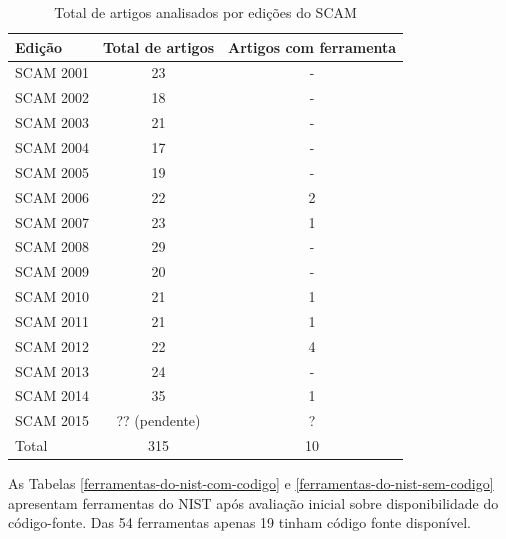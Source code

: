 \documentclass[qual, classic, a4paper]{ufbathesis}
\begin{document}
\begin{table}
\caption{Total de artigos analisados por edições do SCAM}
\centering
\begin{tabular}{| l | c | c |}
\hline
Edição    & Total de artigos & Artigos com ferramenta \\
\hline
SCAM 2001 & 23               & -                      \\
SCAM 2002 & 18               & -                      \\
SCAM 2003 & 21               & -                      \\
SCAM 2004 & 17               & -                      \\
SCAM 2005 & 19               & -                      \\
SCAM 2006 & 22               & 2                      \\
SCAM 2007 & 23               & 1                      \\
SCAM 2008 & 29               & -                      \\
SCAM 2009 & 20               & -                      \\
SCAM 2010 & 21               & 1                      \\
SCAM 2011 & 21               & 1                      \\
SCAM 2012 & 22               & 4                      \\
SCAM 2013 & 24               & -                      \\
SCAM 2014 & 35               & 1                      \\
SCAM 2015 & ?? (pendente)    & ?                      \\
\hline
Total     & 315              & 10                     \\
\hline
\end{tabular}
\label{artigos-do-scam}
\end{table}

As Tabelas \ref{ferramentas-do-nist-com-codigo} e
\ref{ferramentas-do-nist-sem-codigo} apresentam ferramentas do NIST após
avaliação inicial sobre disponibilidade do código-fonte. Das 54 ferramentas
apenas 19 tinham código fonte disponível.

\end{document}
